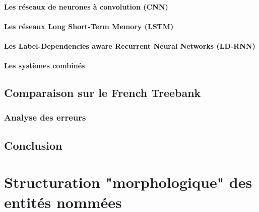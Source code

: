 \documentclass[12pt,a4paper,times,twoside,openright]{report}
\begin{document}
            \subsubsection{Les réseaux de neurones à convolution (CNN)}
            \label{subsubsec:CNNs}
            
            
            \subsubsection{Les réseaux Long Short-Term Memory (LSTM)}
            \label{subsubsec:LSTMs}
            
            
            \subsubsection{Les Label-Dependencies aware Recurrent Neural Networks (LD-RNN)}
            \label{subsubsec:LD-RNN}
            
        
            \subsubsection{Les systèmes combinés}
            \label{subsubsec:NN-combinations}
            
    
    \section{Comparaison sur le French Treebank}
    \label{sec:ftb-comparo}
    
    
        \subsection{Analyse des erreurs}
        \label{subsec:ftb-comparo-errors}
        
    
    \section{Conclusion}
    \label{sec:overview-conclusion}
    


\chapter{Structuration "morphologique" des entités nommées}
\label{chap:morphology}
\minitoc

    
\end{document}
